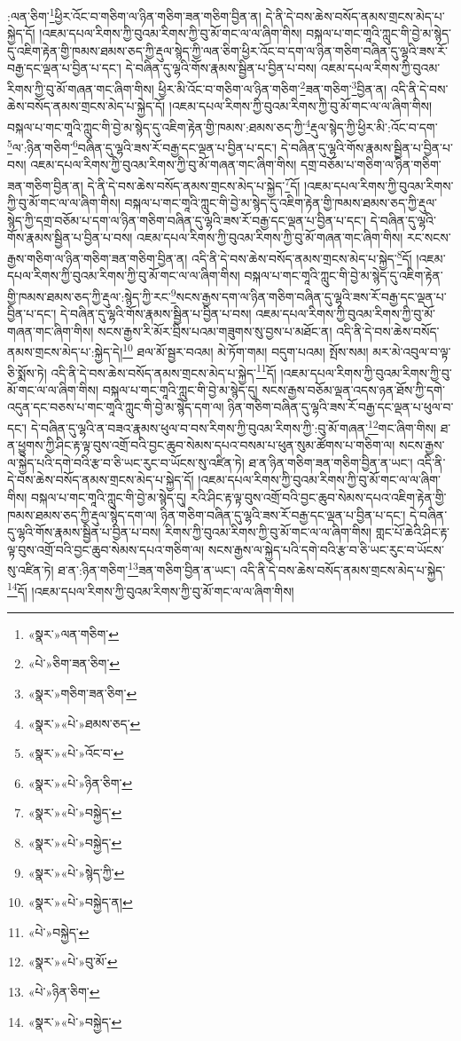 :ལན་ཅིག་\footnote{«སྣར་»ལན་གཅིག་}ཕྱིར་འོང་བ་གཅིག་ལ་ཉིན་གཅིག་ཟན་གཅིག་བྱིན་ན། དེ་ནི་དེ་བས་ཆེས་བསོད་ནམས་གྲངས་མེད་པ་སྐྱེད་དོ། །འཇམ་དཔལ་རིགས་ཀྱི་བུའམ་རིགས་ཀྱི་བུ་མོ་གང་ལ་ལ་ཞིག་གིས། བསྐལ་པ་གང་གཱའི་ཀླུང་གི་བྱེ་མ་སྙེད་དུ་འཇིག་རྟེན་གྱི་ཁམས་ཐམས་ཅད་ཀྱི་རྡུལ་སྙེད་ཀྱི་ལན་ཅིག་ཕྱིར་འོང་བ་དག་ལ་ཉིན་གཅིག་བཞིན་དུ་ལྷའི་ཟས་རོ་བརྒྱ་དང་ལྡན་པ་བྱིན་པ་དང་། དེ་བཞིན་དུ་ལྷའི་གོས་རྣམས་སྦྱིན་པ་བྱིན་པ་བས། འཇམ་དཔལ་རིགས་ཀྱི་བུའམ་རིགས་ཀྱི་བུ་མོ་གཞན་གང་ཞིག་གིས། ཕྱིར་མི་འོང་བ་གཅིག་ལ་ཉིན་གཅིག་\footnote{«པེ་»ཅིག་ཟན་ཅིག་}ཟན་གཅིག་\footnote{«སྣར་»གཅིག་ཟན་ཅིག་}བྱིན་ན། འདི་ནི་དེ་བས་ཆེས་བསོད་ནམས་གྲངས་མེད་པ་སྐྱེད་དོ། །འཇམ་དཔལ་རིགས་ཀྱི་བུའམ་རིགས་ཀྱི་བུ་མོ་གང་ལ་ལ་ཞིག་གིས། བསྐལ་པ་གང་གཱའི་ཀླུང་གི་བྱེ་མ་སྙེད་དུ་འཇིག་རྟེན་གྱི་ཁམས་:ཐམས་ཅད་ཀྱི་\footnote{«སྣར་»«པེ་»ཐམས་ཅད་}རྡུལ་སྙེད་ཀྱི་ཕྱིར་མི་:འོང་བ་དག་\footnote{«སྣར་»«པེ་»འོང་བ་}ལ་:ཉིན་གཅིག་\footnote{«སྣར་»«པེ་»ཉིན་ཅིག་}བཞིན་དུ་ལྷའི་ཟས་རོ་བརྒྱ་དང་ལྡན་པ་བྱིན་པ་དང་། དེ་བཞིན་དུ་ལྷའི་གོས་རྣམས་སྦྱིན་པ་བྱིན་པ་བས། འཇམ་དཔལ་རིགས་ཀྱི་བུའམ་རིགས་ཀྱི་བུ་མོ་གཞན་གང་ཞིག་གིས། དགྲ་བཅོམ་པ་གཅིག་ལ་ཉིན་གཅིག་ཟན་གཅིག་བྱིན་ན། དེ་ནི་དེ་བས་ཆེས་བསོད་ནམས་གྲངས་མེད་པ་སྐྱེད་\footnote{«སྣར་»«པེ་»བསྐྱེད་}དོ། །འཇམ་དཔལ་རིགས་ཀྱི་བུའམ་རིགས་ཀྱི་བུ་མོ་གང་ལ་ལ་ཞིག་གིས། བསྐལ་པ་གང་གཱའི་ཀླུང་གི་བྱེ་མ་སྙེད་དུ་འཇིག་རྟེན་གྱི་ཁམས་ཐམས་ཅད་ཀྱི་རྡུལ་སྙེད་ཀྱི་དགྲ་བཅོམ་པ་དག་ལ་ཉིན་གཅིག་བཞིན་དུ་ལྷའི་ཟས་རོ་བརྒྱ་དང་ལྡན་པ་བྱིན་པ་དང་། དེ་བཞིན་དུ་ལྷའི་གོས་རྣམས་སྦྱིན་པ་བྱིན་པ་བས། འཇམ་དཔལ་རིགས་ཀྱི་བུའམ་རིགས་ཀྱི་བུ་མོ་གཞན་གང་ཞིག་གིས། རང་སངས་རྒྱས་གཅིག་ལ་ཉིན་གཅིག་ཟན་གཅིག་བྱིན་ན། འདི་ནི་དེ་བས་ཆེས་བསོད་ནམས་གྲངས་མེད་པ་སྐྱེད་\footnote{«སྣར་»«པེ་»བསྐྱེད་}དོ། །འཇམ་དཔལ་རིགས་ཀྱི་བུའམ་རིགས་ཀྱི་བུ་མོ་གང་ལ་ལ་ཞིག་གིས། བསྐལ་པ་གང་གཱའི་ཀླུང་གི་བྱེ་མ་སྙེད་དུ་འཇིག་རྟེན་གྱི་ཁམས་ཐམས་ཅད་ཀྱི་རྡུལ་:སྙེད་ཀྱི་རང་\footnote{«སྣར་»«པེ་»སྙེད་ཀྱི་}སངས་རྒྱས་དག་ལ་ཉིན་གཅིག་བཞིན་དུ་ལྷའི་ཟས་རོ་བརྒྱ་དང་ལྡན་པ་བྱིན་པ་དང་། དེ་བཞིན་དུ་ལྷའི་གོས་རྣམས་སྦྱིན་པ་བྱིན་པ་བས། འཇམ་དཔལ་རིགས་ཀྱི་བུའམ་རིགས་ཀྱི་བུ་མོ་གཞན་གང་ཞིག་གིས། སངས་རྒྱས་རི་མོར་བྲིས་པའམ་གཟུགས་སུ་བྱས་པ་མཐོང་ན། འདི་ནི་དེ་བས་ཆེས་བསོད་ནམས་གྲངས་མེད་པ་:སྐྱེད་དེ།\footnote{«སྣར་»«པེ་»བསྐྱེད་ན།} ཐལ་མོ་སྦྱར་བའམ། མེ་ཏོག་གམ། བདུག་པའམ། སྤོས་སམ། མར་མེ་འབུལ་བ་ལྟ་ཅི་སྨོས་ཏེ། འདི་ནི་དེ་བས་ཆེས་བསོད་ནམས་གྲངས་མེད་པ་སྐྱེད་\footnote{«པེ་»བསྐྱེད་}དོ། །འཇམ་དཔལ་རིགས་ཀྱི་བུའམ་རིགས་ཀྱི་བུ་མོ་གང་ལ་ལ་ཞིག་གིས། བསྐལ་པ་གང་གཱའི་ཀླུང་གི་བྱེ་མ་སྙེད་དུ། སངས་རྒྱས་བཅོམ་ལྡན་འདས་ཉན་ཐོས་ཀྱི་དགེ་འདུན་དང་བཅས་པ་གང་གཱའི་ཀླུང་གི་བྱེ་མ་སྙེད་དག་ལ། ཉིན་གཅིག་བཞིན་དུ་ལྷའི་ཟས་རོ་བརྒྱ་དང་ལྡན་པ་ཕུལ་བ་དང་། དེ་བཞིན་དུ་ལྷའི་ན་བཟའ་རྣམས་ཕུལ་བ་བས་རིགས་ཀྱི་བུའམ་རིགས་ཀྱི་:བུ་མོ་གཞན་\footnote{«སྣར་»«པེ་»བུ་མོ་}གང་ཞིག་གིས། ཐ་ན་ཕྱུགས་ཀྱི་ཤིང་རྟ་ལྟ་བུས་འགྲོ་བའི་བྱང་ཆུབ་སེམས་དཔའ་བསམ་པ་ཕུན་སུམ་ཚོགས་པ་གཅིག་ལ། སངས་རྒྱས་ལ་སྐྱེད་པའི་དགེ་བའི་རྩ་བ་ཅི་ཡང་རུང་བ་ཡོངས་སུ་འཛིན་ཏེ། ཐ་ན་ཉིན་གཅིག་ཟན་གཅིག་བྱིན་ན་ཡང་། འདི་ནི་དེ་བས་ཆེས་བསོད་ནམས་གྲངས་མེད་པ་སྐྱེད་དོ། །འཇམ་དཔལ་རིགས་ཀྱི་བུའམ་རིགས་ཀྱི་བུ་མོ་གང་ལ་ལ་ཞིག་གིས། བསྐལ་པ་གང་གཱའི་ཀླུང་གི་བྱེ་མ་སྙེད་དུ། རའི་ཤིང་རྟ་ལྟ་བུས་འགྲོ་བའི་བྱང་ཆུབ་སེམས་དཔའ་འཇིག་རྟེན་གྱི་ཁམས་ཐམས་ཅད་ཀྱི་རྡུལ་སྙེད་དག་ལ། ཉིན་གཅིག་བཞིན་དུ་ལྷའི་ཟས་རོ་བརྒྱ་དང་ལྡན་པ་བྱིན་པ་དང་། དེ་བཞིན་དུ་ལྷའི་གོས་རྣམས་སྦྱིན་པ་བྱིན་པ་བས། རིགས་ཀྱི་བུའམ་རིགས་ཀྱི་བུ་མོ་གང་ལ་ལ་ཞིག་གིས། གླང་པོ་ཆེའི་ཤིང་རྟ་ལྟ་བུས་འགྲོ་བའི་བྱང་ཆུབ་སེམས་དཔའ་གཅིག་ལ། སངས་རྒྱས་ལ་སྐྱེད་པའི་དགེ་བའི་རྩ་བ་ཅི་ཡང་རུང་བ་ཡོངས་སུ་འཛིན་ཏེ། ཐ་ན་:ཉིན་གཅིག་\footnote{«པེ་»ཉིན་ཅིག་}ཟན་གཅིག་བྱིན་ན་ཡང་། འདི་ནི་དེ་བས་ཆེས་བསོད་ནམས་གྲངས་མེད་པ་སྐྱེད་\footnote{«སྣར་»«པེ་»བསྐྱེད་}དོ། །འཇམ་དཔལ་རིགས་ཀྱི་བུའམ་རིགས་ཀྱི་བུ་མོ་གང་ལ་ལ་ཞིག་གིས། 